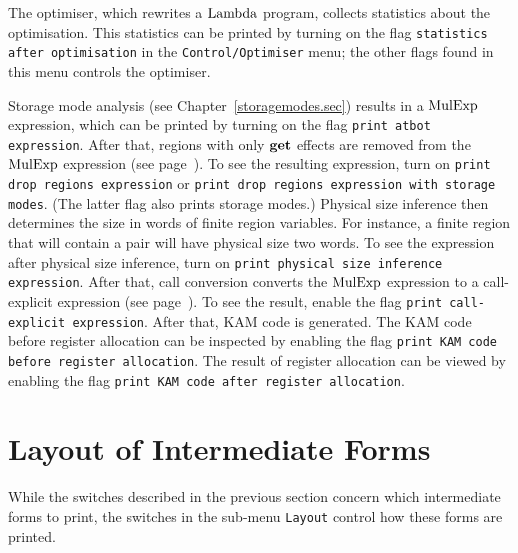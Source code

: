 \documentclass[12pt]{book}
\begin{document}
The optimiser, which rewrites a $\hbox{\rm Lambda}$
program, collects statistics about the optimisation. This statistics
can be printed by turning on the flag
%
%
\texttt{statistics after optimisation} in the
\texttt{Control/Optimiser} menu; the other flags found in this menu
controls the optimiser.

Storage mode analysis (see Chapter~\ref{storagemodes.sec}) results in
a $\hbox{\rm MulExp}$ expression, which can be printed
by turning on the flag
%
\texttt{print atbot expression}.  After that, regions
with only $\mathop{\bf get}\nolimits$ effects are removed from the $\hbox{\rm MulExp}$
expression (see page~\pageref{bother-to-distinguish-get-n-put}).  To
see the resulting expression, turn on 
%
\texttt{print drop regions expression} or \texttt{print drop regions
  expression with storage modes}. (The latter flag also prints storage
modes.)
%
%
Physical size inference then determines the size in words of finite
region variables.  For instance, a finite region that will contain a
pair will have physical size two words.  To see the expression after
physical size inference, turn on 
%
\texttt{print physical size inference expression}.  After that,
%
call conversion converts the $\hbox{\rm MulExp}$ expression to a
call-explicit expression (see
page~\pageref{call-explicit}).  To see the result, enable the flag
\texttt{print call-explicit expression}.  After that,
%
KAM code is generated.  The KAM code before register allocation can be
inspected by enabling the flag 
%
\texttt{print KAM code before register allocation}. The result of
%
register allocation can be viewed by enabling the flag 
%
\texttt{print KAM code after register allocation}.

\section{Layout of Intermediate Forms}
\label{layout_intermediate_forms.sec}
While the switches described in the previous section concern which
intermediate forms to print, the switches in the sub-menu
\texttt{Layout} control how these forms are
printed.
\end{document}
